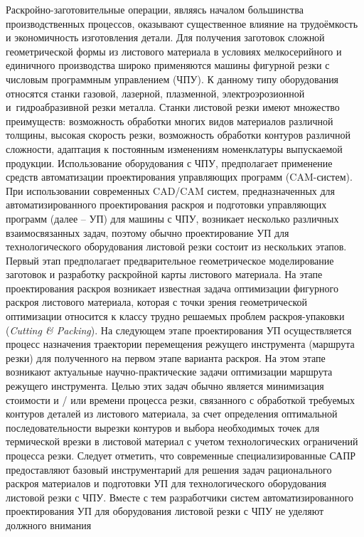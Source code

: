 Раскройно-заготовительные операции,
являясь началом большинства производственных процессов,
оказывают существенное влияние на трудоёмкость
и экономичность изготовления детали.
Для получения заготовок сложной
геометрической формы из листового материала в условиях мелкосерийного и
единичного производства широко применяются машины фигурной резки с
числовым программным управлением
(ЧПУ).
К данному типу оборудования
относятся станки газовой, лазерной, плазменной, электроэрозионной
и~гидроабразивной резки металла. 
Станки листовой резки имеют множество преимуществ: 
возможность обработки многих видов материалов различной толщины, 
высокая скорость резки, возможность обработки контуров различной сложности, 
адаптация к постоянным изменениям номенклатуры выпускаемой продукции. 
Использование оборудования с ЧПУ, предполагает применение
средств автоматизации проектирования управляющих программ
(CAM-систем).
При использовании современных CAD/CAM систем, предназначенных для
автоматизированного проектирования раскроя и подготовки
управляющих программ 
(далее -- УП)
для машины с ЧПУ, возникает несколько различных взаимосвязанных задач,
поэтому обычно
проектирование УП для технологического оборудования листовой резки 
состоит из нескольких этапов. 
Первый этап предполагает предварительное геометрическое моделирование заготовок 
и разработку раскройной карты листового материала. 
На этапе проектирования раскроя возникает известная задача оптимизации фигурного раскроя листового материала, 
которая с точки зрения геометрической оптимизации
относится к классу трудно решаемых проблем раскроя-упаковки 
({\it Cutting \& Packing}). 
На следующем этапе проектирования УП осуществляется процесс назначения траектории 
перемещения режущего инструмента 
(маршрута резки) 
для полученного на первом этапе варианта раскроя. 
На этом этапе возникают актуальные научно-практические задачи 
оптимизации маршрута режущего инструмента. 
Целью этих задач обычно является минимизация стоимости и / или времени процесса резки, 
связанного с обработкой требуемых контуров деталей из листового материала, 
за счет определения оптимальной последовательности вырезки контуров 
и выбора необходимых точек для термической врезки в листовой материал 
с учетом технологических ограничений процесса резки. 
Следует отметить, что современные специализированные САПР предоставляют 
базовый инструментарий для решения задач рационального раскроя материалов 
и подготовки УП для технологического оборудования листовой резки с ЧПУ. 
Вместе с тем разработчики систем автоматизированного проектирования УП 
для оборудования листовой резки с ЧПУ не уделяют должного внимания 
